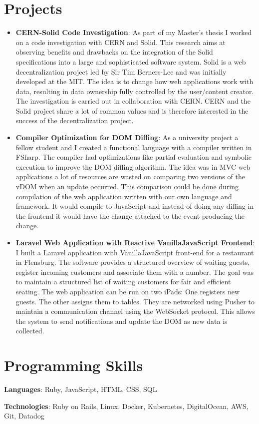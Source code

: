 \documentclass[letterpaper,11pt]{article}
\newcommand{\resumeItem}[2]{
  \item\small{
    \textbf{#1}{: #2 \vspace{-2pt}}
  }
}
\newcommand{\resumeSubItem}[2]{\resumeItem{#1}{#2}\vspace{-4pt}}
\newcommand{\resumeSubHeadingListStart}{\begin{itemize}[leftmargin=*]}
\newcommand{\resumeSubHeadingListEnd}{\end{itemize}}
\begin{document}
\section{Projects}
  \resumeSubHeadingListStart
    \resumeSubItem{CERN-Solid Code Investigation}
      {As part of my Master's thesis I worked on a code investigation with CERN and Solid. This research aims at observing beneﬁts and drawbacks on the integration of the Solid speciﬁcations into a large and sophisticated software system. Solid is a web decentralization project led by Sir Tim Berners-Lee and was initially developed at the MIT. The idea is to change how web applications work with data, resulting in data ownership fully controlled by the user/content creator. The investigation is carried out in collaboration with CERN. CERN and the Solid project share a lot of common values and is therefore interested in the success of the decentralization project.}
    \resumeSubItem{Compiler Optimization for DOM Diﬃng}
      {As a university project a fellow student and I created a functional language with a compiler written in FSharp. The compiler had optimizations like partial evaluation and symbolic execution to improve the DOM diﬃng algorithm. The idea was in MVC web applications a lot of resources are wasted on comparing two versions of the vDOM when an update occurred. This comparison could be done during compilation of the web application written with our own language and framework. It would compile to JavaScript and instead of doing any diﬃng in the frontend it would have the change attached to the event producing the change.}
    \resumeSubItem{Laravel Web Application with Reactive VanillaJavaScript Frontend}
      {I built a Laravel application with VanillaJavaScript front-end for a restaurant in Flensburg. The software provides a structured overview of waiting guests, register incoming customers and associate them with a number. The goal was to maintain a structured list of waiting customers for fair and efficient seating. The web application can be run on two iPads: One registers new guests. The other assigns them to tables. They are networked using Pusher to maintain a communication channel using the WebSocket protocol. This allows the system to send notifications and update the DOM as new data is collected.}
  \resumeSubHeadingListEnd

\section{Programming Skills}
 \resumeSubHeadingListStart
   \item{
     \textbf{Languages}{: Ruby, JavaScript, HTML, CSS, SQL}
     \hfill
   \item
     \textbf{Technologies}{: Ruby on Rails, Linux, Docker, Kubernetes, DigitalOcean, AWS, Git, Datadog }
   }
 \resumeSubHeadingListEnd

\end{document}
